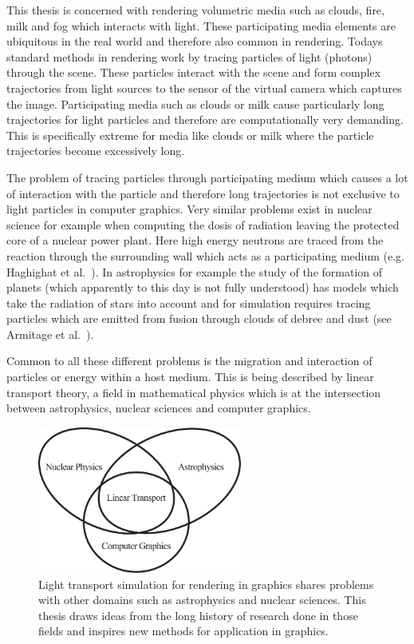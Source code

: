 This thesis is concerned with rendering volumetric media such as clouds, fire, milk and fog which interacts with light. These participating media elements are ubiquitous in the real world and therefore also common in rendering. Todays standard methods in rendering work by tracing particles of light (photons) through the scene. These particles interact with the scene and form complex trajectories from light sources to the sensor of the virtual camera which captures the image. Participating media such as clouds or milk cause particularly long trajectories for light particles and therefore are computationally very demanding. This is specifically extreme for media like clouds or milk where the particle trajectories become excessively long.


The problem of tracing particles through participating medium which causes a lot of interaction with the particle and therefore long trajectories is not exclusive to light particles in computer graphics. Very similar problems exist in nuclear science for example when computing the dosis of radiation leaving the protected core of a nuclear power plant. Here high energy neutrons are traced from the reaction through the surrounding wall which acts as a participating medium (e.g. Haghighat et al.~\cite{Haghighat03}). In astrophysics for example the study of the formation of planets (which apparently to this day is not fully understood) has models which take the radiation of stars into account and for simulation requires tracing particles which are emitted from fusion through clouds of debree and dust (see Armitage et al.~\cite{Armitage11}).

Common to all these different problems is the migration and interaction of particles or energy within a host medium. This is being described by linear transport theory, a field in mathematical physics which is at the intersection between astrophysics, nuclear sciences and computer graphics.
\begin{figure}[ht]
\centering
\includegraphics[width=0.6\textwidth]{02_Introduction/figures/fig_linear_transport.pdf}
\caption{Light transport simulation for rendering in graphics shares problems with other domains such as astrophysics and nuclear sciences. This thesis draws ideas from the long history of research done in those fields and inspires new methods for application in graphics.}
\label{fig:intro_linear_transport_fields}
\end{figure}

